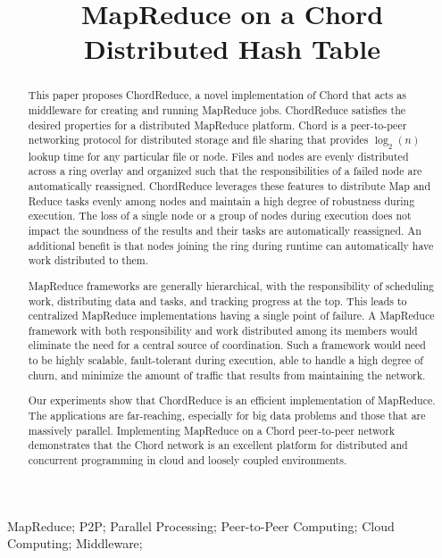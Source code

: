 \documentclass[10pt, conference, compsocconf]{IEEEtran}
\title{MapReduce on a Chord Distributed Hash Table}
\author{\IEEEauthorblockN{Andrew Rosen \qquad Brendan Benshoof \qquad Matt Erwin \qquad Robert W. Harrison \qquad Anu G. Bourgeois}
\IEEEauthorblockA{Department of Computer Science\\
Georgia State University\\
Atlanta, Georgia\\
rosen@cs.gsu.edu}
}
\begin{document}
\maketitle

\begin{abstract}


This paper proposes ChordReduce, a novel implementation of Chord that acts as middleware for creating and running MapReduce jobs. ChordReduce satisfies the desired properties for a distributed MapReduce platform. Chord is a peer-to-peer networking protocol for distributed storage and file sharing that provides $\log_{2}(n)$ lookup time for any particular file or node.  Files and nodes are evenly distributed across a ring overlay and organized such that the responsibilities of a failed node are automatically reassigned.  ChordReduce leverages these features to distribute Map and Reduce tasks evenly among nodes and maintain a high degree of robustness during execution.  The loss of a single node or a group of nodes during execution does not impact the soundness of the results and their tasks are automatically reassigned.  An additional benefit is that nodes joining the ring during runtime can automatically have work distributed to them.

MapReduce frameworks are generally hierarchical, with the responsibility of scheduling work, distributing data and tasks, and tracking progress at the top.  This leads to centralized MapReduce implementations having a single point of failure.  A MapReduce framework with both responsibility and work distributed among its members would eliminate the need for a central source of coordination.  Such a framework would need to be highly scalable, fault-tolerant during execution, able to handle a high degree of churn, and minimize the amount of traffic that results from maintaining the network. 

Our experiments show that ChordReduce is an efficient implementation of MapReduce. The applications are far-reaching, especially for big data problems and those that are massively parallel. Implementing MapReduce on a Chord peer-to-peer network demonstrates that the Chord network is an excellent platform for distributed and concurrent programming in cloud and loosely coupled environments.

\end{abstract}


\begin{IEEEkeywords}
MapReduce; P2P; Parallel Processing; Peer-to-Peer Computing; Cloud Computing; Middleware;

\end{IEEEkeywords}
\end{document}

